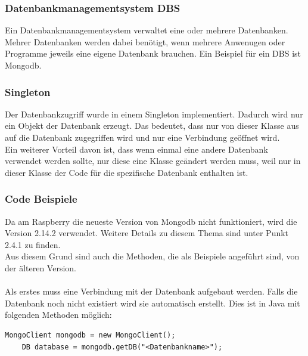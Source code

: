 \subsubsection{Datenbankmanagementsystem DBS}
Ein Datenbankmanagementsystem verwaltet eine oder mehrere Datenbanken. Mehrer Datenbanken werden dabei benötigt, wenn mehrere Anwenugen oder Programme jeweils eine eigene Datenbank brauchen. Ein Beispiel für ein DBS ist Mongodb.

\subsubsection{Singleton}
Der Datenbankzugriff wurde in einem Singleton implementiert. Dadurch wird nur ein Objekt der Datenbank erzeugt. Das bedeutet, dass nur von dieser Klasse aus auf die Datenbank zugegriffen wird und nur eine Verbindung geöffnet wird.
\\ Ein weiterer Vorteil davon ist, dass wenn einmal eine andere Datenbank verwendet werden sollte, nur diese eine Klasse geändert werden muss, weil nur in dieser Klasse der Code für die spezifische Datenbank enthalten ist.

\subsubsection{Code Beispiele}
Da am Raspberry die neueste Version von Mongodb nicht funktioniert, wird die Version 2.14.2 verwendet. Weitere Details zu diesem Thema sind unter Punkt 2.4.1 zu finden.
\\ Aus diesem Grund sind auch die Methoden, die als Beispiele angeführt sind, von der älteren Version. 
\\ \\ 
Als erstes muss eine Verbindung mit der Datenbank aufgebaut werden. Falls die Datenbank noch nicht existiert wird sie automatisch erstellt.
Dies ist in Java mit folgenden Methoden möglich:
\begin{lstlisting}[style=JavaStyle]
	MongoClient mongodb = new MongoClient();
	DB database = mongodb.getDB("<Datenbankname>");
\end{lstlisting}

